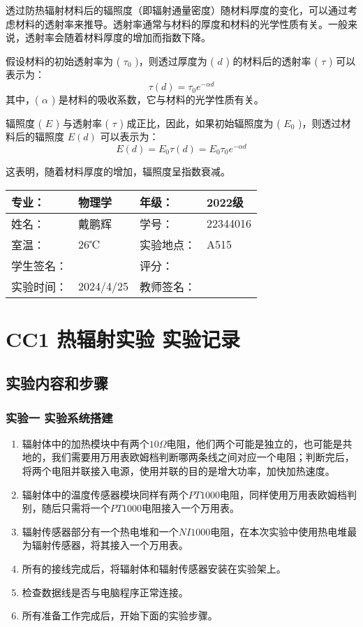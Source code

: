\documentclass[dvipsnames, svgnames,a4paper,11pt]{article}
\begin{document}
	透过防热辐射材料后的辐照度（即辐射通量密度）随材料厚度的变化，可以通过考虑材料的透射率来推导。透射率通常与材料的厚度和材料的光学性质有关。一般来说，透射率会随着材料厚度的增加而指数下降。
	
	假设材料的初始透射率为 ( $\tau_0$ )，则透过厚度为 ( $d$ ) 的材料后的透射率 ( $\tau$ ) 可以表示为：
	\[
		\tau(d)=\tau_0e^{-\alpha d}
	\]
	其中，( $\alpha$ ) 是材料的吸收系数，它与材料的光学性质有关。
	
	辐照度 ( $E$ ) 与透射率 ( $\tau$ ) 成正比，因此，如果初始辐照度为 ( $E_0$ )，则透过材料后的辐照度  $E(d)$  可以表示为：
	\[
		E(d)=E_0\tau(d)=E_0\tau_0 e^{-\alpha d}
	\]
	
	这表明，随着材料厚度的增加，辐照度呈指数衰减。






\clearpage
\begin{table}
	\renewcommand\arraystretch{1.7}
	\centering
	\begin{tabularx}{\textwidth}{|X|X|X|X|}
	\hline
	专业：& 物理学 &年级：& 2022级 \\
	\hline
	姓名：& 戴鹏辉 & 学号：& 22344016 \\
	\hline
	室温：& 26℃ & 实验地点： & A515 \\
	\hline
	学生签名：& & 评分： &\\
	\hline
	实验时间：& 2024/4/25 & 教师签名：&\\
	\hline
	\end{tabularx}
\end{table}

\section{CC1 \quad 热辐射实验 \quad\heiti 实验记录}
\subsection{实验内容和步骤}

\subsubsection{实验一 \quad 实验系统搭建}

	
	\begin{enumerate}
		\item 辐射体中的加热模块中有两个$10\Omega$电阻，他们两个可能是独立的，也可能是共地的，我们需要用万用表欧姆档判断哪两条线之间对应一个电阻；判断完后，将两个电阻并联接入电源，使用并联的目的是增大功率，加快加热速度。
		\item 辐射体中的温度传感器模块同样有两个$PT1000$电阻，同样使用万用表欧姆档判别，随后只需将一个$PT1000$电阻接入一个万用表。
		\item 辐射传感器部分有一个热电堆和一个$NI1000$电阻，在本次实验中使用热电堆最为辐射传感器，将其接入一个万用表。
		\item 所有的接线完成后，将辐射体和辐射传感器安装在实验架上。
		\item 检查数据线是否与电脑程序正常连接。
		\item 所有准备工作完成后，开始下面的实验步骤。
	\end{enumerate}
\end{document}

